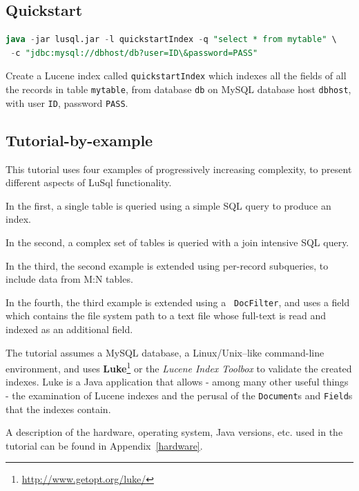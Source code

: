 \label{tutorial}

\subsection{Quickstart}
{\small
\begin{lstlisting}[backgroundcolor=\color{grey},language=SQL]
java -jar lusql.jar -l quickstartIndex -q "select * from mytable" \
 -c "jdbc:mysql://dbhost/db?user=ID\&password=PASS"
\end{lstlisting}
}

Create a Lucene index called {\tt quickstartIndex} which indexes all the
fields of all the records in table {\tt mytable}, from database {\tt db}
on MySQL database host {\tt dbhost}, with user {\tt ID}, password {\tt PASS}. 



\subsection{Tutorial-by-example}

This tutorial uses four examples of progressively increasing complexity,
to present different aspects of LuSql functionality.
\begin{mlist}
\item In the first, a single table is queried using a simple SQL query to produce an
index.
\item In the second, a complex set of tables is queried with a join intensive SQL
query.
\item In the third, the second example is extended using per-record
subqueries, to include data from M:N tables.
\item In the fourth, the third example is extended using a {\tt
  DocFilter},
  and uses a field which contains the file system path to a text file whose
  full-text is read and indexed as an additional field.
\end{mlist}

The tutorial assumes a MySQL database, a Linux/Unix--like command-line
  environment, and uses 
  {\bf Luke}\footnote{\url{http://www.getopt.org/luke/}
}
or the {\em Lucene Index Toolbox} to validate the created indexes.
Luke is a Java application that allows - among many other useful things - the 
examination of Lucene indexes and the perusal of the {\tt Document}s and
  {\tt Field}s that the indexes contain.

A description of the hardware, operating system, Java versions, etc. used in
the tutorial can be found in \mbox{Appendix \ref{hardware}}.


